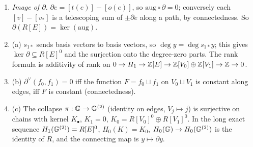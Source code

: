 \begin{outline}
\begin{enumerate}[label=(\arabic*)]
\item \emph{Image of $\partial$.} $\partial e=[t(e)]-[o(e)]$, so $\mathrm{aug}\circ\partial=0$; conversely each $[v]-[v_*]$ is a telescoping sum of $\pm\partial e$
  along a path, by connectedness. So $\partial(R[E])=\ker(\mathrm{aug})$. \stproved
\item (a) $s_{1*}$ sends basis vectors to basis vectors, so $\deg y=\deg s_{1*}y$; this gives $\ker\partial\subseteq R[E]^0$ and the surjection onto the
  degree-zero parts. The rank formula is additivity of rank on $0\to H_1\to\mathbb{Z}[E]\to\mathbb{Z}[V_0]\oplus\mathbb{Z}[V_1]\to\mathbb{Z}\to0$. \stproved
\item (b) $\partial^\vee(f_0,f_1)=0$ iff the function $F=f_0\sqcup f_1$ on $V_0\sqcup V_1$ is constant along edges, iff $F$ is constant (connectedness). \stproved
\item (c) The collapse $\pi:\mathbb{G}\to\mathbb{G}^{(2)}$ (identity on edges, $V_j\mapsto j$) is surjective on chains with kernel $K_\bullet$, $K_1=0$,
  $K_0=R[V_0]^0\oplus R[V_1]^0$. In the long exact sequence $H_1(\mathbb{G}^{(2)})=R[E]^0$, $H_0(K)=K_0$, $H_0(\mathbb{G})\to H_0(\mathbb{G}^{(2)})$ is the identity of $R$, and the connecting
  map is $y\mapsto\partial y$. \stproved
\end{enumerate}
\end{outline}

